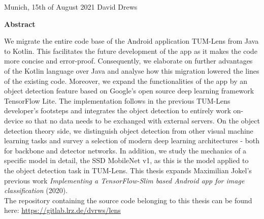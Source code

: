 \documentclass[
			   fontsize=11pt,
               paper=a4,
               bibliography=totoc,
               idxtotoc,
               headsepline,
               footsepline,
               footinclude=false,
               BCOR=12mm,
               DIV=13,
               openany,   %
               ]
               {scrbook}
\def\author{David Drews}
\def\date{15th of August 2021}
\begin{document}
\vspace{15mm}
\noindent
Munich, \date \hspace{5cm} \author
\cleardoubleemptypage


{}
\vspace*{2cm}
\begin{center}
    {\Large \textbf {Abstract}}
\end{center}
\vspace{1cm}

We migrate the entire code base of the Android application TUM-Lens from Java to Kotlin. This facilitates the future development of the app as it makes the code more concise and error-proof. Consequently, we elaborate on further advantages of the Kotlin language over Java and analyse how this migration lowered the lines of the existing code. Moreover, we expand the functionalities of the app by an object detection feature based on Google's open source deep learning framework TensorFlow Lite. The implementation follows in the previous TUM-Lens developer's footsteps and integrates the object detection to entirely work on-device so that no data needs to be exchanged with external servers. On the object detection theory side, we distinguish object detection from other visual machine learning tasks and survey a selection of modern deep learning architectures - both for backbone and detector networks. In addition, we study the mechanics of a specific model in detail, the SSD MobileNet v1, as this is the model applied to the object detection task in TUM-Lens. This thesis expands Maximilian Jokel's previous work \textit{Implementing a TensorFlow-Slim based Android app for image classification} (2020). \\

\noindent The repository containing the source code belonging to this thesis can be found here: \url{https://gitlab.lrz.de/dvrws/lens}

\cleardoublepage

\end{document}
